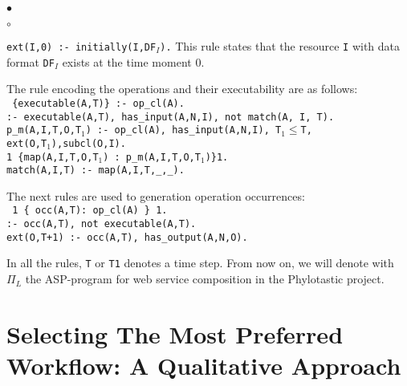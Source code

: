 \documentclass{new_tlp}
\begin{document}
\begin{list}{$\bullet$}{\itemsep=0pt \topsep=1pt \parsep=0pt \leftmargin=10pt}
\begin{list}{$\circ$}{\itemsep=0pt \topsep=1pt \parsep=0pt} 
\item  {\texttt{\small ext(I,0) :- initially(I,DF$_I$).}} \:\: This rule states that the resource \texttt{I} with data format \texttt{DF$_I$} exists at the time moment 0. 

\item The rule encoding the operations and their executability are as follows: \\
\texttt{\small
\hspace*{.5cm} \{executable(A,T)\} :- op\_cl(A).   \\
\hspace*{.5cm} :- executable(A,T), has\_input(A,N,I), not match(A, I, T).  \\
\hspace*{.5cm} p\_m(A,I,T,O,T$_1$) :- op\_cl(A), has\_input(A,N,I), T$_1{\le}$T,  \\
\hspace*{4cm} ext(O,T$_1$),subcl(O,I).  \\
\hspace*{.5cm} 1 \{map(A,I,T,O,T$_1$) : p\_m(A,I,T,O,T$_1$)\}1.\\
\hspace*{.5cm} match(A,I,T) :- map(A,I,T,\_,\_). 
}
\item The next rules are used to generation operation occurrences:  \\
\texttt{\small
\hspace*{.5cm} 1 \{ occ(A,T): op\_cl(A) \} 1.   \\
\hspace*{.5cm} :- occ(A,T), not executable(A,T).\\
\hspace*{.5cm} ext(O,T+1) :- occ(A,T), has\_output(A,N,O). 
}
\end{list} 
%
In all the rules, \texttt{T} or \texttt{T1} denotes a time step.  
 From now on, we will denote with $\Pi_L$ the ASP-program for web service composition in the Phylotastic 
project.  

\end{list} 
\section{Selecting The Most Preferred Workflow: A Qualitative Approach}
\end{document}
